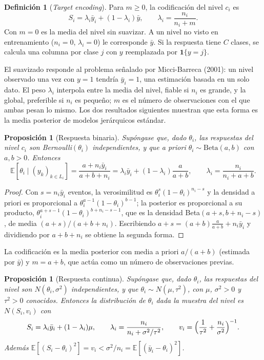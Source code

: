 \documentclass[11pt,a4paper]{article}
\theoremstyle{plain}
\newtheorem{proposicion}[teorema]{Proposición}
\theoremstyle{definition}
\newtheorem{definicion}[teorema]{Definición}
\theoremstyle{remark}
\newcommand{\E}{\mathbb{E}}
\newcommand{\1}{\mathbf{1}}
\newcommand{\ind}[1]{\mathbf{1}\{#1\}}
\begin{document}
\begin{definicion}[\emph{Target encoding}]
Para $m\ge0$, la codificación del nivel $c_i$ es
\[
S_i=\lambda_i\bar y_i+(1-\lambda_i)\bar y,\qquad\lambda_i=\frac{n_i}{n_i+m}.
\]
Con $m=0$ es la media del nivel sin suavizar. A un nivel no visto en
entrenamiento ($n_i=0$, $\lambda_i=0$) le corresponde $\bar y$. Si la
respuesta tiene $C$ clases, se calcula una columna por clase $j$ con $y$
reemplazada por $\ind{y=j}$.
\end{definicion}

El suavizado responde al problema señalado por Micci-Barreca (2001): un
nivel observado una vez con $y=1$ tendría $\bar y_i=1$, una estimación
basada en un solo dato. El peso $\lambda_i$ interpola entre la media del
nivel, fiable si $n_i$ es grande, y la global, preferible si $n_i$ es
pequeño; $m$ es el número de observaciones con el que ambas pesan lo
mismo. Los dos resultados siguientes muestran que esta forma es la media
posterior de modelos jerárquicos estándar.

\begin{proposicion}[Respuesta binaria]\label{prop:betabin}
Supóngase que, dado $\theta_i$, las respuestas del nivel $c_i$ son
Bernoulli$(\theta_i)$ independientes, y que a priori
$\theta_i\sim\text{Beta}(a,b)$ con $a,b>0$. Entonces
\[
\E[\theta_i\mid(y_k)_{k\in L_i}]=\frac{a+n_i\bar y_i}{a+b+n_i}
=\lambda_i\bar y_i+(1-\lambda_i)\frac a{a+b},\qquad
\lambda_i=\frac{n_i}{n_i+a+b}.
\]
\end{proposicion}

\begin{proof}
Con $s=n_i\bar y_i$ eventos, la verosimilitud es
$\theta_i^s(1-\theta_i)^{n_i-s}$ y la densidad a priori es proporcional a
$\theta_i^{a-1}(1-\theta_i)^{b-1}$; la posterior es proporcional a su
producto, $\theta_i^{a+s-1}(1-\theta_i)^{b+n_i-s-1}$, que es la densidad
Beta$(a+s,b+n_i-s)$, de media $(a+s)/(a+b+n_i)$. Escribiendo
$a+s=(a+b)\frac a{a+b}+n_i\bar y_i$ y dividiendo por $a+b+n_i$ se obtiene
la segunda forma.
\end{proof}

La codificación es la media posterior con media a priori $a/(a+b)$
(estimada por $\bar y$) y $m=a+b$, que actúa como un número de
observaciones previas.

\begin{proposicion}[Respuesta continua]\label{prop:normnorm}
Supóngase que, dado $\theta_i$, las respuestas del nivel son
$N(\theta_i,\sigma^2)$ independientes, y que $\theta_i\sim N(\mu,\tau^2)$,
con $\mu$, $\sigma^2>0$ y $\tau^2>0$ conocidos. Entonces la distribución
de $\theta_i$ dada la muestra del nivel es $N(S_i,v_i)$ con
\[
S_i=\lambda_i\bar y_i+(1-\lambda_i)\mu,\qquad
\lambda_i=\frac{n_i}{n_i+\sigma^2/\tau^2},\qquad
v_i=\Bigl(\frac1{\tau^2}+\frac{n_i}{\sigma^2}\Bigr)^{-1}.
\]
Además $\E[(S_i-\theta_i)^2]=v_i<\sigma^2/n_i=\E[(\bar y_i-\theta_i)^2]$.
\end{proposicion}
\end{document}

